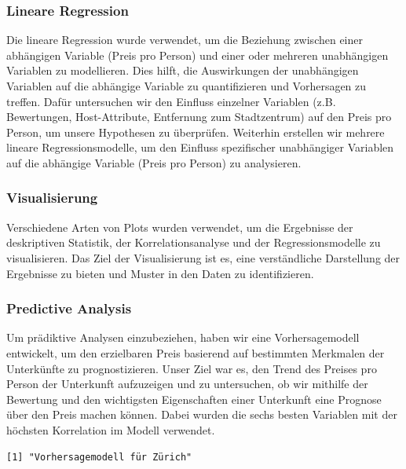 \documentclass[
  journal,
]{IEEEtran}%
\begin{document}
\hypertarget{lineare-regression}{%
\subsubsection{\texorpdfstring{\textbf{Lineare
Regression}}{Lineare Regression}}\label{lineare-regression}}

Die lineare Regression wurde verwendet, um die Beziehung zwischen einer
abhängigen Variable (Preis pro Person) und einer oder mehreren
unabhängigen Variablen zu modellieren. Dies hilft, die Auswirkungen der
unabhängigen Variablen auf die abhängige Variable zu quantifizieren und
Vorhersagen zu treffen. Dafür untersuchen wir den Einfluss einzelner
Variablen (z.B. Bewertungen, Host-Attribute, Entfernung zum
Stadtzentrum) auf den Preis pro Person, um unsere Hypothesen zu
überprüfen. Weiterhin erstellen wir mehrere lineare Regressionsmodelle,
um den Einfluss spezifischer unabhängiger Variablen auf die abhängige
Variable (Preis pro Person) zu analysieren.

\hypertarget{visualisierung}{%
\subsubsection{\texorpdfstring{\textbf{Visualisierung}}{Visualisierung}}\label{visualisierung}}

Verschiedene Arten von Plots wurden verwendet, um die Ergebnisse der
deskriptiven Statistik, der Korrelationsanalyse und der
Regressionsmodelle zu visualisieren. Das Ziel der Visualisierung ist es,
eine verständliche Darstellung der Ergebnisse zu bieten und Muster in
den Daten zu identifizieren.

\hypertarget{predictive-analysis}{%
\subsubsection{\texorpdfstring{\textbf{Predictive
Analysis}}{Predictive Analysis}}\label{predictive-analysis}}

Um prädiktive Analysen einzubeziehen, haben wir eine Vorhersagemodell
entwickelt, um den erzielbaren Preis basierend auf bestimmten Merkmalen
der Unterkünfte zu prognostizieren. Unser Ziel war es, den Trend des
Preises pro Person der Unterkunft aufzuzeigen und zu untersuchen, ob wir
mithilfe der Bewertung und den wichtigsten Eigenschaften einer
Unterkunft eine Prognose über den Preis machen können. Dabei wurden die
sechs besten Variablen mit der höchsten Korrelation im Modell verwendet.

\begin{verbatim}
[1] "Vorhersagemodell für Zürich"
\end{verbatim}
\end{document}
